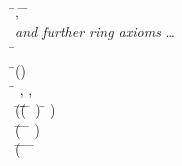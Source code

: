 \begin{hetcasl}
\> \Ax{\forall} \=,  \Ax{:}  \Ax{\bullet} \= \Ax{+}  \Ax{=} \= \Ax{+} \\
\> \KW{\%\%} \emph{and further ring axioms} \dots \\
\> \Ax{\forall} \= \Ax{:}  \\
\> \Ax{\bullet} \=() \\
\>\> \Ax{\Leftrightarrow} \=\Ax{\forall} , ,  \Ax{:}  \\
\>\>\> \Ax{\bullet} \=(\=(\=   \Ax{\Rightarrow} \=  ) \Ax{\wedge} \=  ) \\
\>\>\>\> \Ax{\wedge} (\=   \Ax{\wedge} \=   \Ax{\Rightarrow} \= \Ax{*}   ) \\
\>\>\>\> \Ax{\wedge} (\=   \Ax{\wedge} \=   \Ax{\wedge} \=   \Ax{\wedge} \= \Ax{+}  \Ax{=}  \\

\end{hetcasl}
